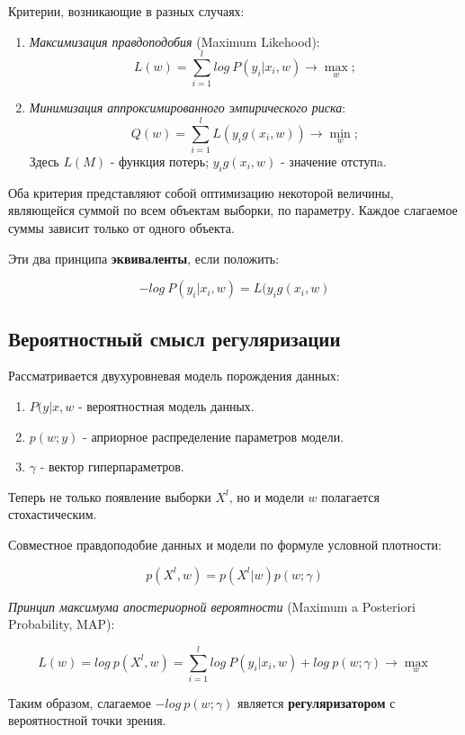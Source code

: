 Критерии, возникающие в разных случаях:
\begin{enumerate}

    \item \textit{Максимизация правдоподобия} (Maximum Likehood): 
    \[
    L(w) = \sum_{i=1}^{l}{log \ P(y_{i}|x_{i},w)} \xrightarrow{} \max_{w};
    \]
    
    \item \textit{Минимизация аппроксимированного эмпирического риска}:
    \[
    Q(w) = \sum_{i=1}^{l}{L(y_{i}g(x_{i},w))} \xrightarrow{} \min_{w};
    \]
    Здесь \(L(M)\) - функция потерь; \(y_{i}g(x_{i}, w)\) - значение отступa.

\end{enumerate}


Оба критерия представляют собой оптимизацию некоторой величины, являющейся суммой по всем объектам выборки, по параметру. Каждое слагаемое суммы зависит только от одного объекта. 

Эти два принципа \textbf{эквиваленты}, если положить:

\[
-log \ P(y_{i}|x_{i},w) = L(y_{i}g(x_{i},w)
\]

\subsection{Вероятностный смысл регуляризации}

Рассматривается двухуровневая модель порождения данных:
\begin{enumerate}
    \item \(P(y|x,w\) - вероятностная модель данных.
    \item \(p(w;y)\) - априорное распределение параметров модели.
    \item \(\gamma\) - вектор гиперпараметров.
\end{enumerate}

Теперь не только появление выборки \(X^{l}\), но и модели \(w\) полагается стохастическим. 

Совместное правдоподобие данных и модели по формуле условной плотности:

\[
p(X^{l},w) = p(X^{l}|w)p(w;\gamma)
\]

\textit{Принцип максимума апостериорной вероятности} (Maximum a Posteriori Probability, MAP):

\[
L(w) = log \ p(X^{l},w) = \sum_{i=1}^{l}{log \ P(y_{i}|x_{i},w) + log \ p(w;\gamma)} \xrightarrow{} \max_{w}
\]

Таким образом, слагаемое \(-log \ p(w;\gamma)\) является \textbf{регуляризатором} с вероятностной точки зрения.

